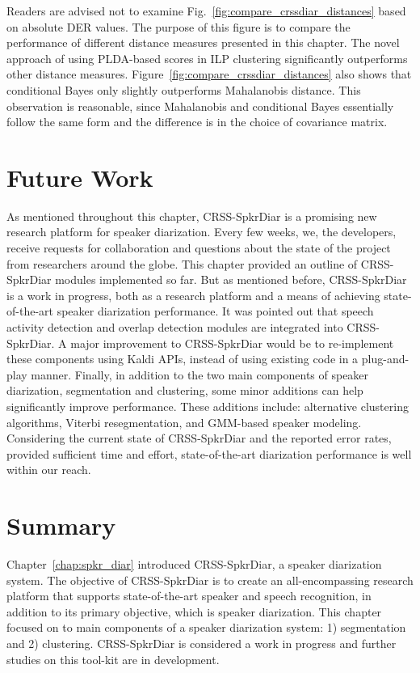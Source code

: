 Readers are advised not to examine Fig.~\ref{fig:compare_crssdiar_distances} based on absolute DER values. 
The purpose of this figure is to compare the performance of different distance measures presented in this chapter. 
The novel approach of using PLDA-based scores in ILP clustering significantly outperforms other distance measures. 
Figure~\ref{fig:compare_crssdiar_distances} also shows that conditional Bayes only slightly outperforms Mahalanobis distance. 
This observation is reasonable, since Mahalanobis and conditional Bayes essentially follow the same form and the difference is in the choice of covariance matrix. 

\section{Future Work}
\label{sec:chDiar_future}
As mentioned throughout this chapter, CRSS-SpkrDiar is a promising new research platform for speaker diarization. 
Every few weeks, we, the developers, receive requests for collaboration and questions about the state of the project from researchers around the globe. 
This chapter provided an outline of CRSS-SpkrDiar modules implemented so far. 
But as mentioned before, CRSS-SpkrDiar is a work in progress, both as a research platform and a means of achieving state-of-the-art speaker diarization performance. 
It was pointed out that speech activity detection and overlap detection modules are integrated into CRSS-SpkrDiar. 
A major improvement to CRSS-SpkrDiar would be to re-implement these components using Kaldi APIs, instead of using existing code in a plug-and-play manner. 
Finally, in addition to the two main components of speaker diarization, segmentation and clustering, some minor additions can help significantly improve performance. 
These additions include: alternative clustering algorithms, Viterbi resegmentation, and GMM-based speaker modeling. 
Considering the current state of CRSS-SpkrDiar and the reported error rates, provided sufficient time and effort, state-of-the-art diarization performance is well within our reach.


\section{Summary}
\label{sec:ch4_summary}
Chapter~\ref{chap:spkr_diar} introduced CRSS-SpkrDiar, a  speaker diarization system. 
The objective of CRSS-SpkrDiar is to create an all-encompassing research platform that supports state-of-the-art speaker and speech recognition, in addition to its primary objective, which is speaker diarization. 
This chapter focused on to main components of a speaker diarization system: 1) segmentation and 2) clustering. 
CRSS-SpkrDiar is considered a work in progress and further studies on this tool-kit are in development. 

